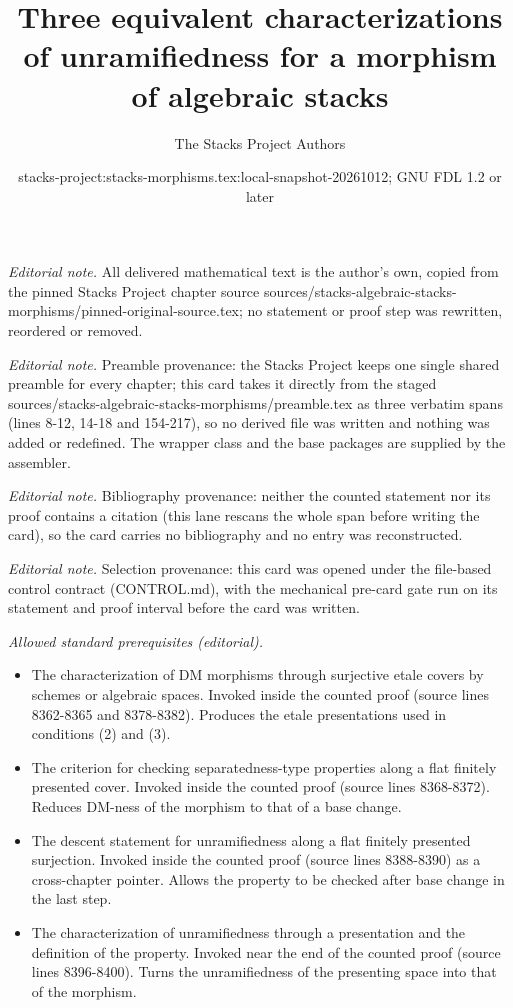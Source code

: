 \documentclass[10pt,a4paper]{amsart}
\title{Three equivalent characterizations of unramifiedness for a morphism of algebraic stacks}
\author{The Stacks Project Authors}
\date{stacks-project:stacks-morphisms.tex:local-snapshot-20261012; GNU FDL 1.2 or later}
\theoremstyle{plain}
\theoremstyle{definition}
\theoremstyle{remark}
\numberwithin{equation}{subsection}
\begin{document}
\maketitle
\noindent\textit{Editorial note.} All delivered mathematical text is the author's own, copied from the pinned Stacks Project chapter source sources/stacks-algebraic-stacks-morphisms/pinned-original-source.tex; no statement or proof step was rewritten, reordered or removed.\par\medskip
\noindent\textit{Editorial note.} Preamble provenance: the Stacks Project keeps one single shared preamble for every chapter; this card takes it directly from the staged sources/stacks-algebraic-stacks-morphisms/preamble.tex as three verbatim spans (lines 8-12, 14-18 and 154-217), so no derived file was written and nothing was added or redefined. The wrapper class and the base packages are supplied by the assembler.\par\medskip
\noindent\textit{Editorial note.} Bibliography provenance: neither the counted statement nor its proof contains a citation (this lane rescans the whole span before writing the card), so the card carries no bibliography and no entry was reconstructed.\par\medskip
\noindent\textit{Editorial note.} Selection provenance: this card was opened under the file-based control contract (CONTROL.md), with the mechanical pre-card gate run on its statement and proof interval before the card was written.\par\medskip
\noindent\textit{Allowed standard prerequisites (editorial).}\begin{itemize}
\item The characterization of DM morphisms through surjective etale covers by schemes or algebraic spaces. Invoked inside the counted proof (source lines 8362-8365 and 8378-8382). Produces the etale presentations used in conditions (2) and (3).
\item The criterion for checking separatedness-type properties along a flat finitely presented cover. Invoked inside the counted proof (source lines 8368-8372). Reduces DM-ness of the morphism to that of a base change.
\item The descent statement for unramifiedness along a flat finitely presented surjection. Invoked inside the counted proof (source lines 8388-8390) as a cross-chapter pointer. Allows the property to be checked after base change in the last step.
\item The characterization of unramifiedness through a presentation and the definition of the property. Invoked near the end of the counted proof (source lines 8396-8400). Turns the unramifiedness of the presenting space into that of the morphism.
\end{itemize}\medskip
\end{document}
